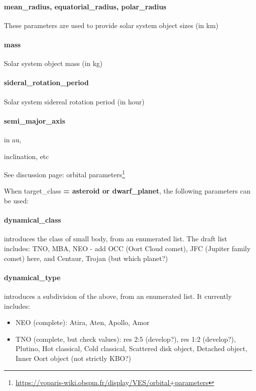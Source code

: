 \documentclass[11pt,a4paper]{ivoa}
\begin{document}
\paragraph{mean\_radius, equatorial\_radius, polar\_radius}

These parameters are used to provide solar system object sizes (in km)

\paragraph{mass}

Solar system object mass (in kg)

\paragraph{sideral\_rotation\_period}

Solar system sidereal rotation period (in hour)

\paragraph{semi\_major\_axis}

in au,

inclination, etc

See discussion page: orbital parameters\footnote{\url{https://voparis-wiki.obspm.fr/display/VES/orbital+parameters}}


When target\_class\textbf{ = asteroid or dwarf\_planet}, the following parameters can be used:\textbf{\\}

\paragraph{dynamical\_class}

introduces the class of small body, from an enumerated list. The draft list includes: TNO, MBA, NEO - add OCC (Oort Cloud comet), JFC (Jupiter family comet) here, and Centaur, Trojan (but which planet?)

\paragraph{dynamical\_type}

introduces a subdivision of the above, from an enumerated list. It currently includes:

\begin{itemize}
\item NEO (complete): Atira, Aten, Apollo, Amor
\item TNO (complete, but check values): res 2:5 (develop?), res 1:2 (develop?), Plutino, Hot classical, Cold classical, Scattered disk object, Detached object, Inner Oort object (not strictly KBO?)
\end{itemize}
\end{document}
